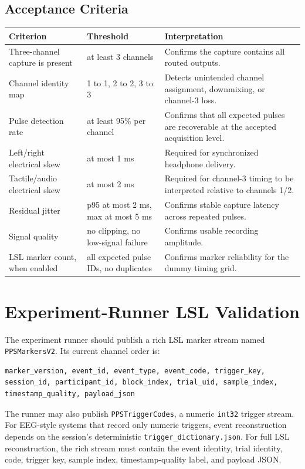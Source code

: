 \documentclass[11pt]{article}
\begin{document}
\subsection{Acceptance Criteria}

\begin{longtable}{|p{}|p{}|p{}|}
\hline
\textbf{Criterion} & \textbf{Threshold} & \textbf{Interpretation} \\
\hline
Three-channel capture is present & at least 3 channels & Confirms the capture
contains all routed outputs. \\
\hline
Channel identity map & 1 to 1, 2 to 2, 3 to 3 & Detects unintended channel
assignment, downmixing, or channel-3 loss. \\
\hline
Pulse detection rate & at least 95\% per channel & Confirms that all expected
pulses are recoverable at the accepted acquisition level. \\
\hline
Left/right electrical skew & at most 1 ms & Required for synchronized
headphone delivery. \\
\hline
Tactile/audio electrical skew & at most 2 ms & Required for channel-3 timing
to be interpreted relative to channels 1/2. \\
\hline
Residual jitter & p95 at most 2 ms, max at most 5 ms & Confirms stable capture
latency across repeated pulses. \\
\hline
Signal quality & no clipping, no low-signal failure & Confirms usable
recording amplitude. \\
\hline
LSL marker count, when enabled & all expected pulse IDs, no duplicates &
Confirms marker reliability for the dummy timing grid. \\
\hline
\end{longtable}

\section{Experiment-Runner LSL Validation}

The experiment runner should publish a rich LSL marker stream named
\texttt{PPSMarkersV2}. Its current channel order is:

\begin{verbatim}
marker_version, event_id, event_type, event_code, trigger_key,
session_id, participant_id, block_index, trial_uid, sample_index,
timestamp_quality, payload_json
\end{verbatim}

The runner may also publish \texttt{PPSTriggerCodes}, a numeric
\texttt{int32} trigger stream. For EEG-style systems that record only numeric
triggers, event reconstruction depends on the session's deterministic
\texttt{trigger\_dictionary.json}. For full LSL reconstruction, the rich stream
must contain the event identity, trial identity, code, trigger key, sample
index, timestamp-quality label, and payload JSON.
\end{document}
